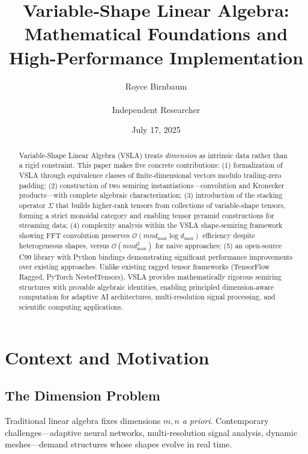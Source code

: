 \documentclass[11pt,twocolumn]{article}
\title{Variable‑Shape Linear Algebra: Mathematical Foundations and High-Performance Implementation}
\author{Royce Birnbaum \\ \email{royce.birnbaum@gmail.com} \\ Independent Researcher}
\date{July 17, 2025}
\begin{document}
\maketitle

\begin{abstract}
Variable‑Shape Linear Algebra (VSLA) treats \emph{dimension} as intrinsic data rather than a rigid constraint. This paper makes five concrete contributions: (1) formalization of VSLA through equivalence classes of finite‑dimensional vectors modulo trailing‑zero padding; (2) construction of two semiring instantiations—convolution and Kronecker products—with complete algebraic characterization; (3) introduction of the stacking operator $\Sigma$ that builds higher-rank tensors from collections of variable-shape tensors, forming a strict monoidal category and enabling tensor pyramid constructions for streaming data; (4) complexity analysis within the VSLA shape-semiring framework showing FFT convolution preserves $\mathcal{O}(mn d_{\max} \log d_{\max})$ efficiency despite heterogeneous shapes, versus $\mathcal{O}(mn d_{\max}^2)$ for naive approaches; (5) an open‑source C99 library with Python bindings demonstrating significant performance improvements over existing approaches. Unlike existing ragged tensor frameworks (TensorFlow Ragged, PyTorch NestedTensors), VSLA provides mathematically rigorous semiring structures with provable algebraic identities, enabling principled dimension‑aware computation for adaptive AI architectures, multi‑resolution signal processing, and scientific computing applications.
\end{abstract}


\section{Context and Motivation}
\subsection{The Dimension Problem}
Traditional linear algebra fixes dimensions \(m,n\) \emph{a priori}.  Contemporary challenges—adaptive neural networks, multi‑resolution signal analysis, dynamic meshes—demand structures whose shapes evolve in real time.  
\end{document}
